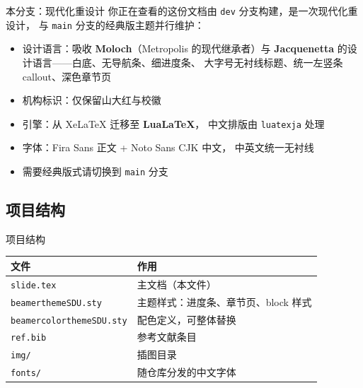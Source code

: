\documentclass[aspectratio=169]{beamer}
\begin{document}
\begin{frame}{本分支：现代化重设计}
    你正在查看的这份文档由 \texttt{dev} 分支构建，是一次现代化重设计，
    与 \texttt{main} 分支的经典版主题并行维护：
    \begin{itemize}
        \item 设计语言：吸收 \textbf{Moloch}（Metropolis 的现代继承者）与
              \textbf{Jacquenetta} 的设计语言——白底、无导航条、细进度条、
              大字号无衬线标题、统一左竖条 callout、深色章节页
        \item 机构标识：仅保留山大红与校徽
        \item 引擎：从 Xe\LaTeX{} 迁移至 \textbf{Lua\LaTeX{}}，
              中文排版由 \texttt{luatexja} 处理
        \item 字体：Fira Sans 正文 + Noto Sans CJK 中文，
              中英文统一无衬线
        \item 需要经典版式请切换到 \texttt{main} 分支
    \end{itemize}
\end{frame}

\subsection{项目结构}

\begin{frame}{项目结构}
    \begin{table}[h]
        \centering
        \begin{tabular}{ll}
            \toprule
            文件                               & 作用                    \\
            \midrule
            \texttt{slide.tex}               & 主文档（本文件）              \\
            \texttt{beamerthemeSDU.sty}      & 主题样式：进度条、章节页、block 样式 \\
            \texttt{beamercolorthemeSDU.sty} & 配色定义，可整体替换            \\
            \texttt{ref.bib}                 & 参考文献条目                \\
            \texttt{img/}                    & 插图目录                  \\
            \texttt{fonts/}                  & 随仓库分发的中文字体            \\
            \bottomrule
        \end{tabular}
    \end{table}
\end{frame}
\end{document}
